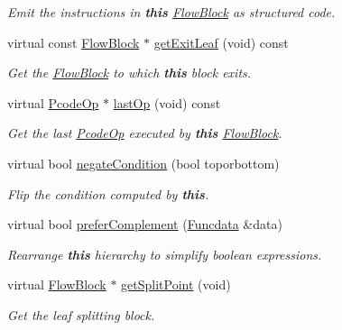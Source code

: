 \begin{DoxyCompactItemize}
\begin{DoxyCompactList}\small\item\em Emit the instructions in {\bfseries{this}} \mbox{\hyperlink{class_flow_block}{Flow\+Block}} as structured code. \end{DoxyCompactList}\item 
virtual const \mbox{\hyperlink{class_flow_block}{Flow\+Block}} $\ast$ \mbox{\hyperlink{class_flow_block_a611bb926194635a0f5cfc0eb16cabe6a}{get\+Exit\+Leaf}} (void) const
\begin{DoxyCompactList}\small\item\em Get the \mbox{\hyperlink{class_flow_block}{Flow\+Block}} to which {\bfseries{this}} block exits. \end{DoxyCompactList}\item 
virtual \mbox{\hyperlink{class_pcode_op}{Pcode\+Op}} $\ast$ \mbox{\hyperlink{class_flow_block_a5db2a7d4baa2070ebf3151b13fd16d09}{last\+Op}} (void) const
\begin{DoxyCompactList}\small\item\em Get the last \mbox{\hyperlink{class_pcode_op}{Pcode\+Op}} executed by {\bfseries{this}} \mbox{\hyperlink{class_flow_block}{Flow\+Block}}. \end{DoxyCompactList}\item 
virtual bool \mbox{\hyperlink{class_flow_block_ae0f8a479ae1548280ff0b4f45bc08dc3}{negate\+Condition}} (bool toporbottom)
\begin{DoxyCompactList}\small\item\em Flip the condition computed by {\bfseries{this}}. \end{DoxyCompactList}\item 
virtual bool \mbox{\hyperlink{class_flow_block_a6ab46f9a87bc94b30bd3bee0923b3f51}{prefer\+Complement}} (\mbox{\hyperlink{class_funcdata}{Funcdata}} \&data)
\begin{DoxyCompactList}\small\item\em Rearrange {\bfseries{this}} hierarchy to simplify boolean expressions. \end{DoxyCompactList}\item 
virtual \mbox{\hyperlink{class_flow_block}{Flow\+Block}} $\ast$ \mbox{\hyperlink{class_flow_block_a20996aacbad259e2e4a7bb0c72482335}{get\+Split\+Point}} (void)
\begin{DoxyCompactList}\small\item\em Get the leaf splitting block. \end{DoxyCompactList}\item 

\end{DoxyCompactItemize}
